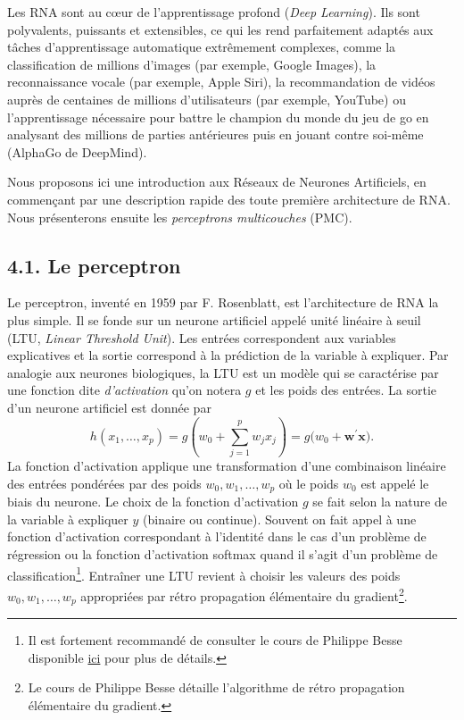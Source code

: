 \documentclass[11pt,]{article}
\begin{document}
Les RNA sont au cœur de l'apprentissage profond (\emph{Deep Learning}).
Ils sont polyvalents, puissants et extensibles, ce qui les rend
parfaitement adaptés aux tâches d'apprentissage automatique extrêmement
complexes, comme la classification de millions d'images (par exemple,
Google Images), la reconnaissance vocale (par exemple, Apple Siri), la
recommandation de vidéos auprès de centaines de millions d'utilisateurs
(par exemple, YouTube) ou l'apprentissage nécessaire pour battre le
champion du monde du jeu de go en analysant des millions de parties
antérieures puis en jouant contre soi-même (AlphaGo de DeepMind).

Nous proposons ici une introduction aux Réseaux de Neurones Artificiels,
en commençant par une description rapide des toute première architecture
de RNA. Nous présenterons ensuite les \emph{perceptrons multicouches}
(PMC).

\hypertarget{le-perceptron}{%
\subsection{4.1. Le perceptron}\label{le-perceptron}}

Le perceptron, inventé en 1959 par F. Rosenblatt, est l'architecture de
RNA la plus simple. Il se fonde sur un neurone artificiel appelé unité
linéaire à seuil (LTU, \emph{Linear Threshold Unit}). Les entrées
correspondent aux variables explicatives et la sortie correspond à la
prédiction de la variable à expliquer. Par analogie aux neurones
biologiques, la LTU est un modèle qui se caractérise par une fonction
dite \emph{d'activation} qu'on notera \(g\) et les poids des entrées. La
sortie d'un neurone artificiel est donnée par
\[h(x_1, \ldots, x_p) = g\left(w_0 + \sum_{j = 1}^p w_j x_j \right) = g\big(w_0 + \bm{w}^\prime \bm{x}\big).\]
La fonction d'activation applique une transformation d'une combinaison
linéaire des entrées pondérées par des poids \(w_0, w_1, \ldots, w_p\)
où le poids \(w_0\) est appelé le biais du neurone. Le choix de la
fonction d'activation \(g\) se fait selon la nature de la variable à
expliquer \(y\) (binaire ou continue). Souvent on fait appel à une
fonction d'activation correspondant à l'identité dans le cas d'un
problème de régression ou la fonction d'activation softmax quand il
s'agit d'un problème de classification\footnote{Il est fortement
  recommandé de consulter le cours de Philippe Besse disponible
  \href{https://www.math.univ-toulouse.fr/~besse/Wikistat/pdf/st-m-app-rn.pdf}{ici}
  pour plus de détails.}. Entraîner une LTU revient à choisir les
valeurs des poids \(w_0, w_1, \ldots, w_p\) appropriées par rétro
propagation élémentaire du gradient\footnote{Le cours de Philippe Besse
  détaille l'algorithme de rétro propagation élémentaire du gradient.}.
\end{document}
